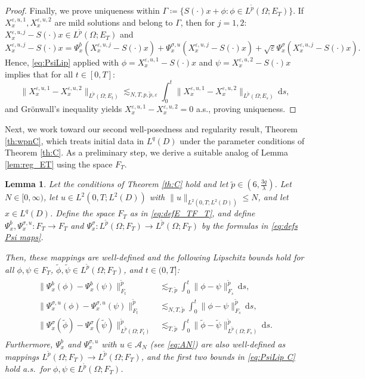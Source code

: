 \documentclass[10pt,a4paper]{amsart}
\newtheorem{lemma}[theorem]{Lemma}
\numberwithin{equation}{section}
\newcommand{\ceqq}{\coloneqq}
\newcommand{\col}{\colon}
\newcommand{\eps}{\varepsilon}
\newcommand{\Om}{\Omega}
\newcommand{\A}{{\mathcal A}}
\newcommand{\dd}{\,\mathrm{d}}
\begin{document}
\begin{proof}
Finally, we prove uniqueness within $\Gamma\ceqq \{S(\cdot)x+\phi:\phi\in L^{\tilde p}(\Om;E_T)\}$.  If $X_x^{\eps,u,1}, X_x^{\eps,u,2}$ are mild solutions and belong to $\Gamma$, then for $j=1,2$: $X_x^{\eps,u,j}-S(\cdot)x \in L^{\tilde p}(\Om;E_T)$ and 
\[
X_x^{\eps,u,j}-S(\cdot)x=\Psi_x^b(X_x^{\eps,u,j}-S(\cdot)x)+\Psi_x^{\sigma,u}(X_x^{\eps,u,j}-S(\cdot)x)+\sqrt{\eps}\Psi_x^\sigma(X_x^{\eps,u,j}-S(\cdot)x).
\]
Hence, \eqref{eq:PsiLip} applied with $\phi=X_x^{\eps,u,1}-S(\cdot)x$ and $\psi=X_x^{\eps,u,2}-S(\cdot)x$ implies that for all $t\in[0,T]$:  
$$
\|X_x^{\eps,u,1}-{X}_x^{\eps,u,2}\|_{L^{\tilde p}(\Om;E_t)}\lesssim_{N,T,p,\tilde p,\eps}\int_0^t\|X_x^{\eps,u,1}- {X}_x^{\eps,u,2}\|_{L^{\tilde p}(\Om;E_s)}\dd s,
$$ 
and Gr\"onwall's inequality yields $X_x^{\eps,u,1}-{X}_x^{\eps,u,2}=0$ a.s., proving uniqueness. 
\end{proof}


Next, we work toward our second well-posedness and regularity result, Theorem \ref{th:wpnC}, which treats   initial data in $L^q(D)$ under the parameter conditions of Theorem \ref{th:C}. 
As a preliminary step, we derive a suitable analog of Lemma \ref{lem:reg_ET} using the space $F_T$. 

\begin{lemma}\label{lem:regC}
Let the conditions of Theorem \ref{th:C} hold and let $\tilde{p}\in (6,\frac{3q}{\lambda})$.     
Let  $N\in[0,\infty)$, let $u\in L^2(0,T;L^2(D))$ with $\|u\|_{L^2(0,T;L^2(D))}\leq N$, and let $x\in L^q(D)$. 
Define the space $F_T$ as in \eqref{eq:defE_TF_T}, 
and define $\Psi_x^b, \Psi_x^{\sigma,u}\col F_T \to F_T$  and $\Psi_x^\sigma\col L^{\tilde p}(\Om;F_T)\to L^{\tilde p}(\Om;F_T)$ by  the formulas in \eqref{eq:defs Psi maps}. 

Then, these mappings are well-defined and the following Lipschitz bounds hold for all   $\phi,\psi \in F_T$,   $\tilde\phi,\tilde\psi\in L^{\tilde p}(\Om;F_T)$, and $t\in(0,T]$:
\begin{align}\label{eq:PsiLip C}
\begin{split}
\|\Psi_x^{b}(\phi)-\Psi_x^{b}(\psi)\|_{F_t}^{\tilde{p}} 
    &\lesssim_{T,\tilde p} \int_0^t \|\phi-\psi\|_{F_s}^{\tilde{p}}\dd s,\\ 
    \|\Psi_x^{\sigma,u}(\phi)-\Psi_x^{\sigma,u}(\psi)\|_{F_t}^{\tilde p} 
    &\lesssim_{N,T,\tilde p} \int_0^t \|\phi-\psi\|_{F_s}^{\tilde p} \dd s,\\ 
    \|\Psi_x^{\sigma}(\tilde\phi)-\Psi_x^{\sigma}(\tilde\psi)\|_{L^{\tilde{p}}(\Om;F_t)}^{\tilde{p}}
    &\lesssim_{T,\tilde p} \int_0^t \|\tilde\phi-\tilde\psi\|_{L^{\tilde{p}}(\Om;F_s)}^{\tilde{p}}\dd s.  
 \end{split}
 \end{align}  
 Furthermore,  $\Psi_x^b$ and $\Psi_x^{\sigma,u}$ with $u\in \A_N$ (see \eqref{eq:AN}) are also well-defined as mappings $L^{\tilde p}(\Om;F_T)\to L^{\tilde p}(\Om;F_T)$, and the first two bounds in \eqref{eq:PsiLip C} hold a.s.\ for $\phi,\psi\in L^{\tilde p}(\Om;F_T)$. 
\end{lemma}
\end{document}
